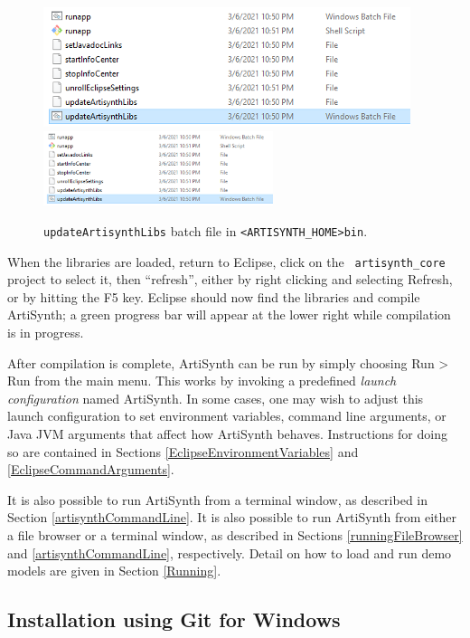 \ifWindows
\begin{figure}[h]
\begin{center}
\iflatexml
   \includegraphics[]{images/UpdateArtisynthLibs}
\else
   \includegraphics[width=0.6\textwidth]{images/UpdateArtisynthLibs}
\fi
\end{center}
\caption{%
{\tt updateArtisynthLibs} batch file in {\tt <ARTISYNTH\_HOME>\SEP bin}.}
\label{UpdateArtisynthLibs:fig}
\end{figure}
\fi

When the libraries are loaded, return to Eclipse, click on the {\tt
artisynth\_core} project to select it, then ``refresh'', either by
right clicking and selecting {\sf Refresh}, or by hitting the {\sf F5}
key. Eclipse should now find the libraries and compile ArtiSynth; a
green progress bar will appear at the lower right while compilation is
in progress.

After compilation is complete, ArtiSynth can be run by simply choosing
{\sf Run > Run} from the main menu. This works by invoking a
predefined {\it launch configuration} named ArtiSynth.  In some cases,
one may wish to adjust this launch configuration to set environment
variables, command line arguments, or Java JVM arguments that affect
how ArtiSynth behaves.  Instructions for doing so are contained in
Sections
\ref{EclipseEnvironmentVariables} and \ref{EclipseCommandArguments}.

\ifLinux
It is also possible to run ArtiSynth from a terminal window,
as described in Section \ref{artisynthCommandLine}.
\else %
It is also possible to run ArtiSynth from either a file browser or a
terminal window, as described in Sections \ref{runningFileBrowser}
and \ref{artisynthCommandLine}, respectively.
\fi
Detail on how to load and run demo models are given in
Section \ref{Running}.

\ifWindows
\subsection{Installation using Git for Windows}
\label{GitForWindows}

